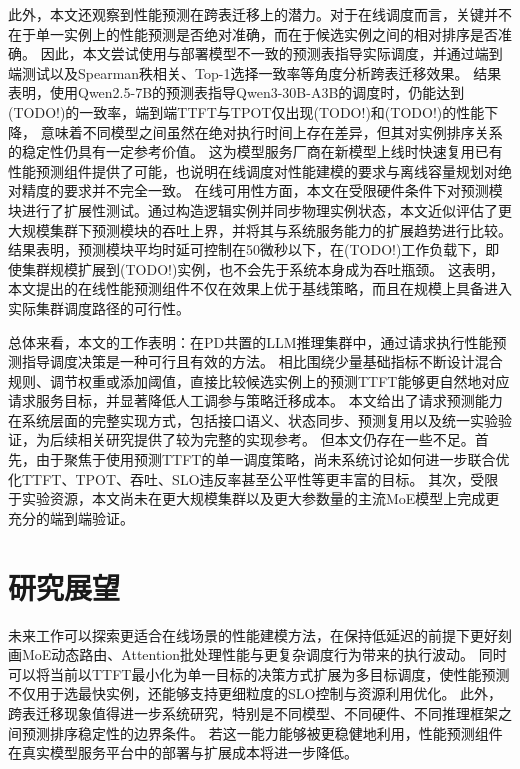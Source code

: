 此外，本文还观察到性能预测在跨表迁移上的潜力。对于在线调度而言，关键并不在于单一实例上的性能预测是否绝对准确，而在于候选实例之间的相对排序是否准确。
因此，本文尝试使用与部署模型不一致的预测表指导实际调度，并通过端到端测试以及Spearman秩相关、Top-1选择一致率等角度分析跨表迁移效果。
结果表明，使用Qwen2.5-7B的预测表指导Qwen3-30B-A3B的调度时，仍能达到(TODO!)的一致率，端到端TTFT与TPOT仅出现(TODO!)和(TODO!)的性能下降，
意味着不同模型之间虽然在绝对执行时间上存在差异，但其对实例排序关系的稳定性仍具有一定参考价值。
这为模型服务厂商在新模型上线时快速复用已有性能预测组件提供了可能，也说明在线调度对性能建模的要求与离线容量规划对绝对精度的要求并不完全一致。
在线可用性方面，本文在受限硬件条件下对预测模块进行了扩展性测试。通过构造逻辑实例并同步物理实例状态，本文近似评估了更大规模集群下预测模块的吞吐上界，并将其与系统服务能力的扩展趋势进行比较。
结果表明，预测模块平均时延可控制在50微秒以下，在(TODO!)工作负载下，即使集群规模扩展到(TODO!)实例，也不会先于系统本身成为吞吐瓶颈。
这表明，本文提出的在线性能预测组件不仅在效果上优于基线策略，而且在规模上具备进入实际集群调度路径的可行性。

总体来看，本文的工作表明：在PD共置的LLM推理集群中，通过请求执行性能预测指导调度决策是一种可行且有效的方法。
相比围绕少量基础指标不断设计混合规则、调节权重或添加阈值，直接比较候选实例上的预测TTFT能够更自然地对应请求服务目标，并显著降低人工调参与策略迁移成本。
本文给出了请求预测能力在系统层面的完整实现方式，包括接口语义、状态同步、预测复用以及统一实验验证，为后续相关研究提供了较为完整的实现参考。
但本文仍存在一些不足。首先，由于聚焦于使用预测TTFT的单一调度策略，尚未系统讨论如何进一步联合优化TTFT、TPOT、吞吐、SLO违反率甚至公平性等更丰富的目标。
其次，受限于实验资源，本文尚未在更大规模集群以及更大参数量的主流MoE模型上完成更充分的端到端验证。

\section{研究展望}
未来工作可以探索更适合在线场景的性能建模方法，在保持低延迟的前提下更好刻画MoE动态路由、Attention批处理性能与更复杂调度行为带来的执行波动。
同时可以将当前以TTFT最小化为单一目标的决策方式扩展为多目标调度，使性能预测不仅用于选最快实例，还能够支持更细粒度的SLO控制与资源利用优化。
此外，跨表迁移现象值得进一步系统研究，特别是不同模型、不同硬件、不同推理框架之间预测排序稳定性的边界条件。
若这一能力能够被更稳健地利用，性能预测组件在真实模型服务平台中的部署与扩展成本将进一步降低。
